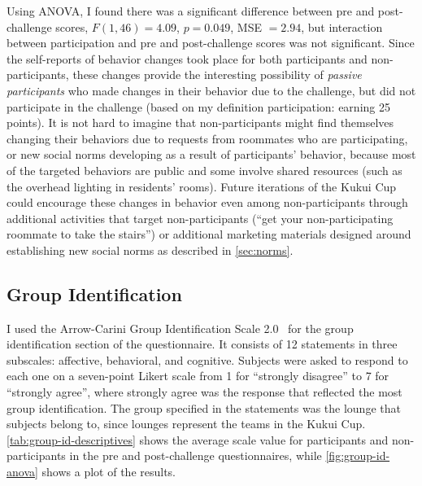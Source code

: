 Using ANOVA, I found there was a significant difference between pre and post-challenge scores, \(F(1, 46) = 4.09\), \(p = 0.049\), MSE \(= 2.94\), but interaction between participation and pre and post-challenge scores was not significant. Since the self-reports of behavior changes took place for both participants and non-participants, these changes provide the interesting possibility of \emph{passive participants} who made changes in their behavior due to the challenge, but did not participate in the challenge (based on my definition participation: earning 25 points). It is not hard to imagine that non-participants might find themselves changing their behaviors due to requests from roommates who are participating, or new social norms developing as a result of participants' behavior, because most of the targeted behaviors are public and some involve shared resources (such as the overhead lighting in residents' rooms). Future iterations of the Kukui Cup could encourage these changes in behavior even among non-participants through additional activities that target non-participants (``get your non-participating roommate to take the stairs'') or additional marketing materials designed around establishing new social norms as described in \autoref{sec:norms}.


\subsection{Group Identification}
\label{sec:group-id}

I used the Arrow-Carini Group Identification Scale 2.0~\cite{Henry1999} for the group identification section of the questionnaire. It consists of 12 statements in three subscales: affective, behavioral, and cognitive. Subjects were asked to respond to each one on a seven-point Likert scale from 1 for ``strongly disagree'' to 7 for ``strongly agree'', where strongly agree was the response that reflected the most group identification. The group specified in the statements was the lounge that subjects belong to, since lounges represent the teams in the Kukui Cup. \autoref{tab:group-id-descriptives} shows the average scale value for participants and non-participants in the pre and post-challenge questionnaires, while \autoref{fig:group-id-anova} shows a plot of the results.

